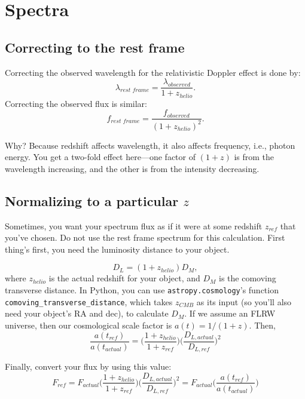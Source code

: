 \section{Spectra}
\subsection{Correcting to the rest frame}
\label{sec:spec_restframe}
Correcting the observed wavelength for the relativistic Doppler effect is done by: 
\begin{equation}
    \lambda_{rest \,\, frame} = \frac{\lambda_{observed}}{1+z_{helio}}.
\end{equation}
Correcting the observed flux is similar: 
\begin{equation}
    f_{rest \,\, frame} = \frac{f_{observed}}{(1+z_{helio})^{2}}.
\end{equation}

Why? Because redshift affects wavelength, it also affects frequency, i.e., photon energy. You get a two-fold effect here---one factor of $(1 + z)$ is from the wavelength increasing, and the other is from the intensity decreasing. 

\subsection{Normalizing to a particular $z$}
Sometimes, you want your spectrum flux as if it were at some redshift $z_{ref}$ that you've chosen. Do not use the rest frame spectrum for this calculation. First thing's first, you need the luminosity distance to your object.

\begin{equation}
    D_{L} = (1+z_{helio})D_{M},
\end{equation}
where $z_{helio}$ is the actual redshift for your object, and $D_{M}$ is the comoving transverse distance. In Python, you can use \texttt{astropy.cosmology}'s function \texttt{comoving\_transverse\_distance}, which takes $z_{CMB}$ as its input (so you'll also need your object's RA and dec), to calculate $D_{M}$. If we assume an FLRW universe, then our cosmological scale factor is $a(t) = 1/(1+z)$. Then,
\begin{equation}
    \frac{a(t_{ref})}{a(t_{actual})} = \Big( \frac{1 + z_{helio}}{1+z_{ref}} \Big) \Big( \frac{D_{L, actual}}{D_{L, ref}} \Big)^{2}
\end{equation}

Finally, convert your flux by using this value:
\begin{equation}
    F_{ref} = F_{actual}\Big( \frac{1 + z_{helio}}{1+z_{ref}} \Big) \Big( \frac{D_{L, actual}}{D_{L, ref}} \Big)^{2} = F_{actual} \Big(\frac{a(t_{ref})}{a(t_{actual})} \Big)
\end{equation}

